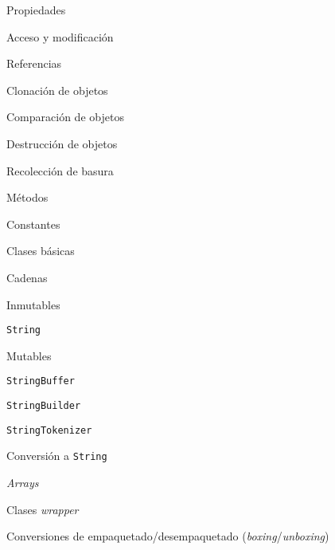 \begin{longenum}
\begin{longenum}
\begin{longenum}
            \item Propiedades
            \begin{longenum}
                \item Acceso y modificación
            \end{longenum}
            \item Referencias
            \item Clonación de objetos
            \item Comparación de objetos
            \item Destrucción de objetos
            \begin{longenum}
                \item Recolección de basura
            \end{longenum}
            \item Métodos
            \item Constantes
        \end{longenum}
        \item Clases básicas
        \begin{longenum}
            \item Cadenas
            \begin{longenum}
                \item Inmutables
                \begin{longenum}
                    \item \texttt{String}
                \end{longenum}
                \item Mutables
                \begin{longenum}
                    \item \texttt{StringBuffer}
                    \item \texttt{StringBuilder}
                    \item \texttt{StringTokenizer}
                \end{longenum}
                \item Conversión a \texttt{String}
            \end{longenum}
            \item \textit{Arrays}
            \item Clases \textit{wrapper}
            \begin{longenum}
                \item Conversiones de empaquetado/desempaquetado (\textit{boxing}/\textit{unboxing})
            \end{longenum}

\end{longenum}
\end{longenum}
\end{longenum}
